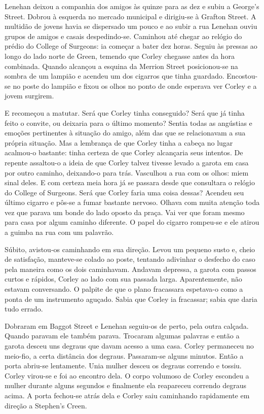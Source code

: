 Lenehan deixou a companhia dos amigos às quinze para as dez e subiu a
George's Street. Dobrou à esquerda no mercado municipal e dirigiu-se
à Grafton Street. A multidão de jovens havia se dispersado um pouco e
ao subir a rua Lenehan ouviu grupos de amigos e casais despedindo-se.
Caminhou até chegar ao relógio do prédio do College of Surgeons: ia
começar a bater dez horas. Seguiu às pressas ao longo do lado norte de
Green, temendo que Corley chegasse antes da hora combinada. Quando
alcançou a esquina da Merrion Street posicionou-se na sombra de um
lampião e acendeu um dos cigarros que tinha guardado. Encostou-se no
poste do lampião e fixou os olhos no ponto de onde esperava ver Corley
e a jovem surgirem.

E recomeçou a matutar. Será que Corley tinha conseguido? Será que já
tinha feito o convite, ou deixaria para o último momento? Sentia
todas as angústias e emoções pertinentes à situação do amigo, além das
que se relacionavam a sua própria situação. Mas a lembrança de que
Corley tinha a cabeça no lugar acalmou-o bastante: tinha certeza de
que Corley alcançaria seus intentos. De repente assaltou-o a ideia de
que Corley talvez tivesse levado a garota em casa por outro caminho,
deixando-o para trás. Vasculhou a rua com os olhos: miem sinal
deles. E com certeza meia hora já se passara desde que consultara o
relógio do College of Surgeons. Será que Corley faria uma coisa
dessas? Acendeu seu último cigarro e pôs-se a fumar bastante nervoso.
Olhava com muita atenção toda vez que parava um bonde do lado oposto
da praça. Vai ver que foram mesmo para casa por algum caminho
diferente. O papel do cigarro rompeu-se e ele atirou a guimba na rua
com um palavrão.

Súbito, avistou-os caminhando em sua direção. Levou um pequeno susto
e, cheio de satisfação, manteve-se colado ao poste, tentando adivinhar
o desfecho do caso pela maneira como os dois caminhavam. Andavam
depressa, a garota com passos curtos e rápidos, Corley ao lado com sua
passada larga. Aparentemente, não estavam conversando. O palpite de
que o plano fracassara espetava-o como a ponta de um instrumento
aguçado. Sabia que Corley ia fracassar; sabia que daria tudo errado.

Dobraram em Baggot Street e Lenehan seguiu-os de perto, pela outra
calçada. Quando paravam ele também parava. Trocaram algumas palavras e
então a garota desceu uns degraus que davam acesso a uma casa. Corley
permaneceu no meio-fio, a certa distância dos degraus. Passaram-se
alguns minutos. Então a porta abriu-se lentamente. Unia mulher
desceu os degraus correndo e tossiu. Corley virou-se e foi ao encontro
dela. O corpo volumoso de Corley escondeu a mulher durante alguns
segundos e finalmente ela reapareceu correndo degraus acima. A porta
fechou-se atrás dela e Corley saiu caminhando rapidamente em direção a
Stephen's Creen.

